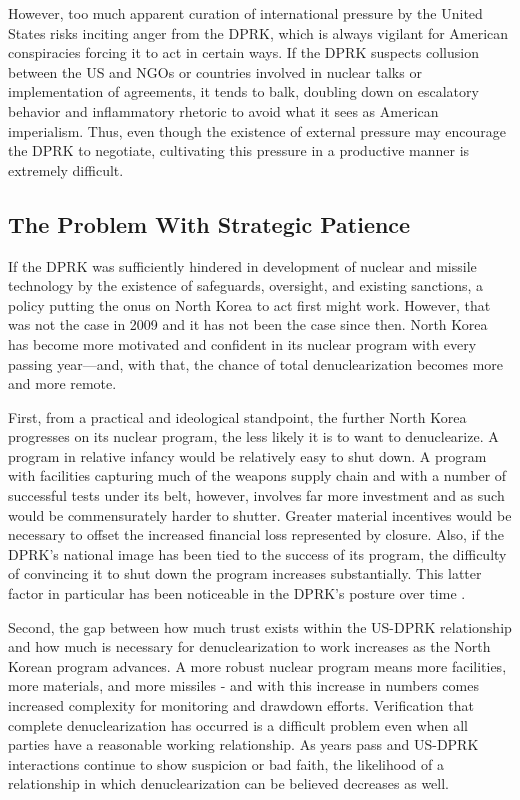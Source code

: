 However, too much apparent curation of international pressure by the United States risks inciting anger from the DPRK, which is always vigilant for American conspiracies forcing it to act in certain ways. If the DPRK suspects collusion between the US and NGOs or countries involved in nuclear talks or implementation of agreements, it tends to balk, doubling down on escalatory behavior and inflammatory rhetoric to avoid what it sees as American imperialism. Thus, even though the existence of external pressure may encourage the DPRK to negotiate, cultivating this pressure in a productive manner is extremely difficult.

\subsection{The Problem With Strategic Patience}

If the DPRK was sufficiently hindered in development of nuclear and missile technology by the existence of safeguards, oversight, and existing sanctions, a policy putting the onus on North Korea to act first might work. However, that was not the case in 2009 and it has not been the case since then. North Korea has become more motivated and confident in its nuclear program with every passing year---and, with that, the chance of total denuclearization becomes more and more remote.

First, from a practical and ideological standpoint, the further North Korea progresses on its nuclear program, the less likely it is to want to denuclearize. A program in relative infancy would be relatively easy to shut down. A program with facilities capturing much of the weapons supply chain and with a number of successful tests under its belt, however, involves far more investment and as such would be commensurately harder to shutter. Greater material incentives would be necessary to offset the increased financial loss represented by closure. Also, if the DPRK's national image has been tied to the success of its program, the difficulty of convincing it to shut down the program increases substantially. This latter factor in particular has been noticeable in the DPRK's posture over time \cite{rich14,hecker2}.

Second, the gap between how much trust exists within the US-DPRK relationship and how much is necessary for denuclearization to work increases as the North Korean program advances. A more robust nuclear program means more facilities, more materials, and more missiles - and with this increase in numbers comes increased complexity for monitoring and drawdown efforts. Verification that complete denuclearization has occurred is a difficult problem even when all parties have a reasonable working relationship. As years pass and US-DPRK interactions continue to show suspicion or bad faith, the likelihood of a relationship in which denuclearization can be believed decreases as well.

